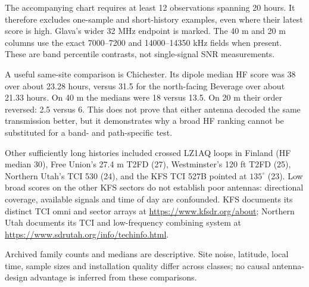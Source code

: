 \documentclass[11pt,a4paper]{article}
\begin{document}
The accompanying chart requires at least 12 observations spanning 20 hours.
It therefore excludes one-sample and short-history examples, even where their
latest score is high. Glava's wider 32 MHz endpoint is marked. The 40 m and
20 m columns use the exact 7000--7200 and 14000--14350 kHz fields when present.
These are band percentile contrasts, not single-signal SNR measurements.

A useful same-site comparison is Chichester. Its dipole median HF score was
38 over about 23.28 hours, versus 31.5 for the north-facing Beverage over
about 21.33 hours. On 40 m the medians were 18 versus 13.5. On 20 m their
order reversed: 2.5 versus 6. This does not prove that either antenna decoded
the same transmission better, but it demonstrates why a broad HF ranking
cannot be substituted for a band- and path-specific test.

Other sufficiently long histories included crossed LZ1AQ loops in Finland
(HF median 30), Free Union's 27.4 m T2FD (27), Westminster's 120 ft T2FD
(25), Northern Utah's TCI 530 (24), and the KFS TCI 527B pointed at
$135^\circ$ (23). Low broad scores on the other KFS sectors do not establish
poor antennas: directional coverage, available signals and time of day are
confounded. KFS documents its distinct TCI omni and sector arrays at
\url{https://www.kfsdr.org/about}; Northern Utah documents its TCI and
low-frequency combining system at
\url{https://www.sdrutah.org/info/techinfo.html}.

Archived family counts and medians are descriptive. Site noise, latitude,
local time, sample sizes and installation quality differ across classes;
no causal antenna-design advantage is inferred from these comparisons.
\end{document}
